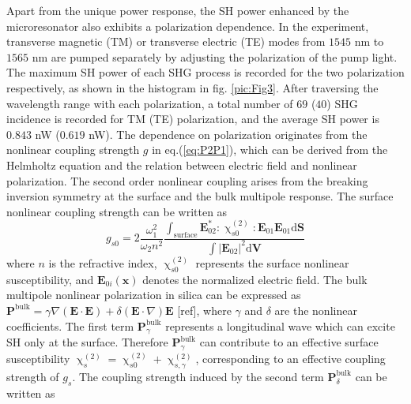 \documentclass[a4paper,8pt,hyperref, twocolumn]{article}
\begin{document}





Apart from the unique power response, the SH power enhanced by the microresonator also exhibits a polarization dependence. 
In the experiment, transverse magnetic (TM) or transverse electric (TE) modes from $1545$ nm to $1565$ nm are pumped separately by adjusting the polarization of the pump light. 
The maximum SH power of each SHG process is recorded for the two polarization respectively, as shown in the histogram in fig. \ref{pic:Fig3}. 
After traversing the wavelength range with each polarization, a total number of $69$ ($40$) SHG incidence is recorded for TM (TE) polarization, and the average SH power is $0.843$ nW ($0.619$ nW). 
The dependence on polarization originates from the %
nonlinear coupling strength $g$ in eq.(\ref{eq:P2P1}), which can be derived from the Helmholtz equation and the relation between electric field and nonlinear polarization. %
The second order nonlinear coupling arises from the breaking inversion symmetry at the surface and the bulk multipole response. The surface nonlinear coupling strength can be written as
\begin{equation}
g_{s0} = 2\frac{\omega_1^2}{\omega_2n^2}\frac{\int_{\mathrm{surface} } \mathbf{E}_{02}^*:\upchi^{(2)}_{s0}:\mathbf{E}_{01}\mathbf{E}_{01} \mathrm{d}	\mathbf{S}}{\int |\mathbf{E}_{02}|^2 \mathrm{d}	\mathbf{V}}
\end{equation}
where $n$ is the refractive index, $\upchi^{(2)}_{s0}$ represents the surface nonlinear susceptibility, and $\mathbf{E}_{0i}(\mathbf{x})$ denotes the  normalized electric field. %
The bulk multipole nonlinear polarization in silica can be expressed as $\mathbf{P}^{\mathrm{bulk}} =  \gamma\nabla(\mathbf{E}\cdot\mathbf{E})+\delta(\mathbf{E}\cdot\nabla)\mathbf{E}$ [ref], where $\gamma$ and $\delta$ are the nonlinear coefficients. The first term $\mathbf{P}^{\mathrm{bulk}}_\gamma$ represents a longitudinal wave which can excite SH only at the surface. Therefore $\mathbf{P}^{\mathrm{bulk}}_\gamma$ can contribute to an effective surface susceptibility $\upchi^{(2)}_s = \upchi^{(2)}_{s0}+\upchi^{(2)}_{s,\gamma}$\cite{heinz1991second}, corresponding to an effective coupling strength of $g_s$. The coupling strength induced by the second term $\mathbf{P}^{\mathrm{bulk}}_\delta$ can be written as %
\end{document}
